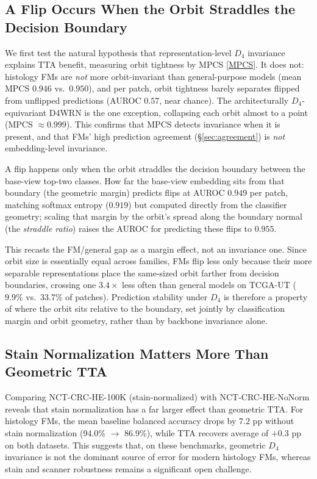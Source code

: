 \documentclass{melba}
\begin{document}
\subsection{A Flip Occurs When the Orbit Straddles the Decision Boundary}
\label{sec:orbit}

We first test the natural hypothesis that representation-level $D_4$ invariance explains TTA benefit, measuring orbit tightness by MPCS \eqref{MPCS}. It does not: histology FMs are \emph{not} more orbit-invariant than general-purpose models (mean MPCS $0.946$ vs.\ $0.950$), and per patch, orbit tightness barely separates flipped from unflipped predictions (AUROC $0.57$, near chance). The architecturally $D_4$-equivariant D4WRN is the one exception, collapsing each orbit almost to a point (MPCS $\approx 0.999$). This confirms that MPCS detects invariance when it is present, and that FMs' high prediction agreement (\S\ref{sec:agreement}) is \emph{not} embedding-level invariance.

A flip happens only when the orbit straddles the decision boundary between the base-view top-two classes. How far the base-view embedding sits from that boundary (the geometric margin) predicts flips at AUROC $0.949$ per patch, matching softmax entropy ($0.919$) but computed directly from the classifier geometry; scaling that margin by the orbit's spread along the boundary normal (the \emph{straddle ratio}) raises the AUROC for predicting these flips to $0.955$.

This recasts the FM/general gap as a margin effect, not an invariance one. Since orbit size is essentially equal across families, FMs flip less only because their more separable representations place the same-sized orbit farther from decision boundaries, crossing one $3.4\times$ less often than general models on TCGA-UT ($9.9\%$ vs.\ $33.7\%$ of patches). Prediction stability under $D_4$ is therefore a property of where the orbit sits relative to the boundary, set jointly by classification margin and orbit geometry, rather than by backbone invariance alone.


\subsection{Stain Normalization Matters More Than Geometric TTA}

Comparing NCT-CRC-HE-100K (stain-normalized) with NCT-CRC-HE-NoNorm reveals that stain normalization has a far larger effect than geometric TTA. For histology FMs, the mean baseline balanced accuracy drops by $7.2$ pp without stain normalization (94.0\% $\to$ 86.9\%), while TTA recovers average of $+0.3$ pp on both datasets. This suggests that, on these benchmarks, geometric $D_4$ invariance is not the dominant source of error for modern histology FMs, whereas stain and scanner robustness remains a significant open challenge.
\end{document}

